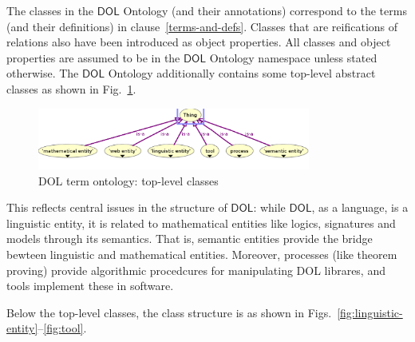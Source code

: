 \documentclass[10pt,fleqn,final]{scrreprt}
\newcommand*{\DOL}{\ensuremath{\mathsf{DOL}}\xspace}
\newcommand{\clauserefname}{clause}
\newcommand{\cref}[1]{\clauserefname~\ref{#1}}
\newenvironment{definitions}[0]{\medskip }{}
\begin{document}
\begin{definitions}
The classes in the \DOL Ontology (and their annotations) correspond to the terms (and their definitions) in \cref{terms-and-defs}. Classes that are reifications of relations also have been introduced as object properties.  All classes and object properties are assumed to be in the \DOL Ontology namespace unless stated otherwise. 
The \DOL Ontology additionally contains some top-level abstract classes
as shown in Fig.~\ref{fig:dol-onto-classes}.

\begin{figure}
  \centering
    \includegraphics[width=0.8\textwidth]{illustrations/dol-onto-classes.png}
  \caption{DOL term ontology: top-level classes}
  \label{fig:dol-onto-classes}
\end{figure}



This reflects central issues in the structure of \DOL:
while \DOL, as a language, is a linguistic entity, it is
related to mathematical entities like logics, signatures and models
through its semantics. That is, semantic entities provide the
bridge bewteen linguistic and mathematical entities.
Moreover, processes (like theorem proving) provide algorithmic
procedcures for manipulating DOL librares, and tools implement
these in software.

Below the top-level classes, the class structure is as shown
in Figs.~\ref{fig:linguistic-entity}--\ref{fig:tool}.
 


\end{definitions}
\end{document}
